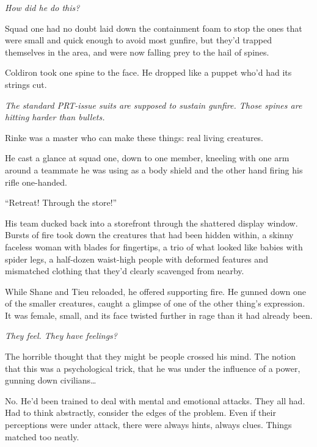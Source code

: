 \emph{How did he do this?}



Squad one had no doubt laid down the containment foam to stop the ones that were small and quick enough to avoid most gunfire, but they'd trapped themselves in the area, and were now falling prey to the hail of spines.



Coldiron took one spine to the face.  He dropped like a puppet who'd had its strings cut.



\emph{The standard PRT-issue suits are supposed to sustain gunfire.  Those spines are hitting harder than bullets.}



Rinke was a master who can make these things: real living creatures.



He cast a glance at squad one, down to one member, kneeling with one arm around a teammate he was using as a body shield and the other hand firing his rifle one-handed.



``Retreat!  Through the store!''



His team ducked back into a storefront through the shattered display window.  Bursts of fire took down the creatures that had been hidden within, a skinny faceless woman with blades for fingertips, a trio of what looked like babies with spider legs, a half-dozen waist-high people with deformed features and mismatched clothing that they'd clearly scavenged from nearby.



While Shane and Tieu reloaded, he offered supporting fire.  He gunned down one of the smaller creatures, caught a glimpse of one of the other thing's expression.  It was female, small, and its face twisted further in rage than it had already been.



\emph{They feel.  They have feelings?}



The horrible thought that they might be people crossed his mind.  The notion that this was a psychological trick, that he was under the influence of a power, gunning down civilians\ldots



No.  He'd been trained to deal with mental and emotional attacks.  They all had.  Had to think abstractly, consider the edges of the problem.  Even if their perceptions were under attack, there were always hints, always clues.  Things matched too neatly.



